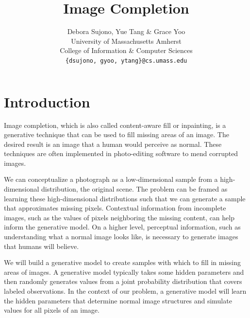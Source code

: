 \documentclass[10pt,twocolumn,letterpaper]{article}
\begin{document}
\title{Image Completion}

\author{Debora Sujono, Yue Tang \& Grace Yoo \\ 
University of Massachusetts Amherst \\ 
College of Information \& Computer Sciences \\
{\tt\small \{dsujono, gyoo, ytang\}@cs.umass.edu} \\
}

\maketitle

\section{Introduction}
Image completion, which is also called content-aware fill or inpainting, is a generative technique that can be used to fill missing areas of an image. The desired result is an image that a human would perceive as normal. These techniques are often implemented in photo-editing software to mend corrupted images.

\par We can conceptualize a photograph as a low-dimensional sample from a high-dimensional distribution, the original scene. The problem can be framed as learning these high-dimensional distributions such that we can generate a sample that approximates missing pixels. Contextual information from incomplete images, such as the values of pixels neighboring the missing content, can help inform the generative model. On a higher level, perceptual information, such as understanding what a normal image looks like, is necessary to generate images that humans will believe. %

\par We will build a generative model to create samples with which to fill in missing areas of images. A generative model typically takes some hidden parameters and then randomly generates values from a joint probability distribution that covers labeled observations. In the context of our problem, a generative model will learn the hidden parameters that determine normal image structures and simulate values for all pixels of an image.
\end{document}
